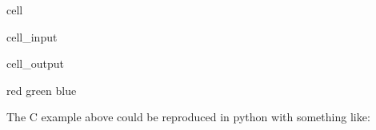 \documentclass[letterpaper,10pt,english]{jupyterBook}
\begin{document}
\begin{sphinxuseclass}{cell}\begin{sphinxVerbatimInput}

\begin{sphinxuseclass}{cell_input}
\begin{sphinxVerbatim}[commandchars=\\\{\}]
  \PYG{p}{[}\PYG{p}{]}
   
\end{sphinxVerbatim}

\end{sphinxuseclass}\end{sphinxVerbatimInput}
\begin{sphinxVerbatimOutput}

\begin{sphinxuseclass}{cell_output}
\begin{sphinxVerbatim}[commandchars=\\\{\}]
red
green
blue
\end{sphinxVerbatim}

\end{sphinxuseclass}\end{sphinxVerbatimOutput}

\end{sphinxuseclass}
\sphinxAtStartPar
The C example above could be reproduced in python with something like:
\end{document}
